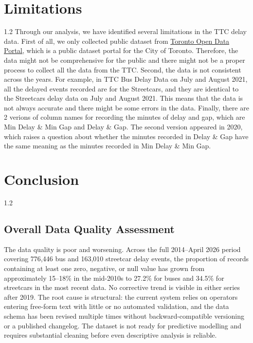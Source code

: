 \documentclass[11pt]{article}
\begin{document}
\vspace{-0.25em}
\section{Limitations}
\vspace{-0.5em}
\begin{spacing}{1.2}
Through our analysis, we have identified several limitations in the TTC delay data. First of all, we only
collected public dataset from \href{https://open.toronto.ca/dataset}{Toronto Open Data Portal}, which is 
a public dataset portal for the City of Toronto. Therefore, the data might not be comprehensive for the public
and there might not be a proper process to collect all the data from the TTC. Second, the data is
not consistent across the years. For example, in TTC Bus Delay Data on July and August 2021, all the
delayed events recorded are for the Streetcars, and they are identical to the Streetcars delay data on 
July and August 2021. This means that the data is not always accurate and there might be some errors in the 
data. Finally, there are 2 verions of column names for recording the minutes of delay and gap, which are 
Min Delay \& Min Gap and Delay \& Gap. The second version appeared in 2020, which raises a question about
whether the minutes recorded in Delay \& Gap have the same meaning as the minutes recorded in Min Delay \& Min Gap.
\end{spacing}

\vspace{-0.25em}
\section{Conclusion}
\vspace{-0.5em}
\begin{spacing}{1.2}
\subsection{Overall Data Quality Assessment}
\vspace{-0.25em}
The data quality is poor and worsening. Across the full 2014--April 2026 period covering
776,446 bus and 163,010 streetcar delay events, the proportion of records containing at least one
zero, negative, or null value has grown from approximately 15--18\% in the mid-2010s to 27.2\%
for buses and 34.5\% for streetcars in the most recent data. No corrective trend is visible in
either series after 2019. The root cause is structural: the current system relies on operators
entering free-form text with little or no automated validation, and the data schema has been
revised multiple times without backward-compatible versioning or a published changelog. The 
dataset is not ready for predictive modelling and requires substantial cleaning before
even descriptive analysis is reliable.
\end{spacing}
\vspace{-0.25em}
\end{document}
